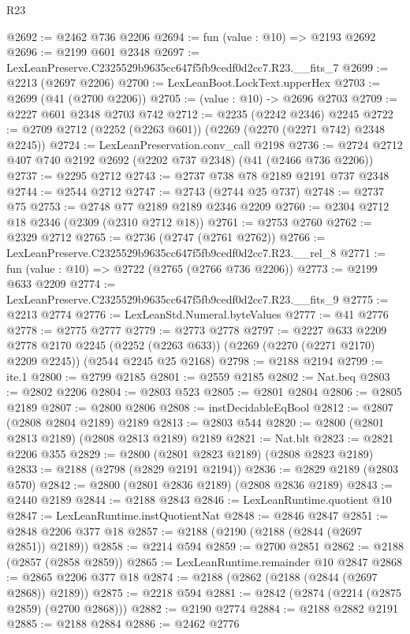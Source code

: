 \begin{lexlean}{R23}
\begin{coremodule}
@2692 := @2462 @736 @2206
@2694 := fun (value : @10) => @2193 @2692
@2696 := @2199 @601 @2348
@2697 := LexLeanPreserve.C2325529b9635cc647f5fb9cedf0d2cc7.R23.__fits_7
@2699 := @2213 (@2697 @2206)
@2700 := LexLeanBoot.LockText.upperHex
@2703 := @2699 (@41 (@2700 @2206))
@2705 := (value : @10) -> @2696 @2703
@2709 := @2227 @601 @2348 @2703 @742
@2712 := @2235 (@2242 @2346) @2245
@2722 := @2709 @2712 (@2252 (@2263 @601)) (@2269 (@2270 (@2271 @742) @2348 @2245))
@2724 := LexLeanPreservation.conv_call @2198
@2736 := @2724 @2712 @407 @740 @2192 @2692 (@2202 @737 @2348) (@41 (@2466 @736 @2206))
@2737 := @2295 @2712
@2743 := @2737 @738 @78 @2189 @2191 @737 @2348
@2744 := @2544 @2712
@2747 := @2743 (@2744 @25 @737)
@2748 := @2737 @75
@2753 := @2748 @77 @2189 @2189 @2346 @2209
@2760 := @2304 @2712 @18 @2346 (@2309 (@2310 @2712 @18))
@2761 := @2753 @2760
@2762 := @2329 @2712
@2765 := @2736 (@2747 (@2761 @2762))
@2766 := LexLeanPreserve.C2325529b9635cc647f5fb9cedf0d2cc7.R23.__rel_8
@2771 := fun (value : @10) => @2722 (@2765 (@2766 @736 @2206))
@2773 := @2199 @633 @2209
@2774 := LexLeanPreserve.C2325529b9635cc647f5fb9cedf0d2cc7.R23.__fits_9
@2775 := @2213 @2774
@2776 := LexLeanStd.Numeral.byteValues
@2777 := @41 @2776
@2778 := @2775 @2777
@2779 := @2773 @2778
@2797 := @2227
    @633
    @2209
    @2778
    @2170
    @2245
    (@2252 (@2263 @633))
    (@2269 (@2270 (@2271 @2170) @2209 @2245))
    (@2544 @2245 @25 @2168)
@2798 := @2188 @2194
@2799 := ite.{1}
@2800 := @2799 @2185
@2801 := @2559 @2185
@2802 := Nat.beq
@2803 := @2802 @2206
@2804 := @2803 @523
@2805 := @2801 @2804
@2806 := @2805 @2189
@2807 := @2800 @2806
@2808 := instDecidableEqBool
@2812 := @2807 (@2808 @2804 @2189) @2189
@2813 := @2803 @544
@2820 := @2800 (@2801 @2813 @2189) (@2808 @2813 @2189) @2189
@2821 := Nat.blt
@2823 := @2821 @2206 @355
@2829 := @2800 (@2801 @2823 @2189) (@2808 @2823 @2189)
@2833 := @2188 (@2798 (@2829 @2191 @2194))
@2836 := @2829 @2189 (@2803 @570)
@2842 := @2800 (@2801 @2836 @2189) (@2808 @2836 @2189)
@2843 := @2440 @2189
@2844 := @2188 @2843
@2846 := LexLeanRuntime.quotient @10
@2847 := LexLeanRuntime.instQuotientNat
@2848 := @2846 @2847
@2851 := @2848 @2206 @377 @18
@2857 := @2188 (@2190 (@2188 (@2844 (@2697 @2851)) @2189))
@2858 := @2214 @594
@2859 := @2700 @2851
@2862 := @2188 (@2857 (@2858 @2859))
@2865 := LexLeanRuntime.remainder @10 @2847
@2868 := @2865 @2206 @377 @18
@2874 := @2188 (@2862 (@2188 (@2844 (@2697 @2868)) @2189))
@2875 := @2218 @594
@2881 := @2842 (@2874 (@2214 (@2875 @2859) (@2700 @2868)))
@2882 := @2190 @2774
@2884 := @2188 @2882 @2191
@2885 := @2188 @2884
@2886 := @2462 @2776

\end{coremodule}
\end{lexlean}
